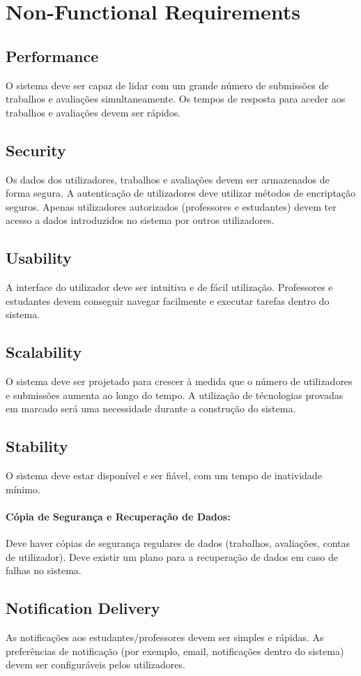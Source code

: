\documentclass[10pt]{article}
\begin{document}
\newpage

\section{Non-Functional Requirements}

\subsection{Performance}
O sistema deve ser capaz de lidar com um grande número de submissões de trabalhos e avaliações simultaneamente. 
Os tempos de resposta para aceder aos trabalhos e avaliações devem ser rápidos.

\subsection{Security}
Os dados dos utilizadores, trabalhos e avaliações devem ser armazenados de forma segura. 
A autenticação de utilizadores deve utilizar métodos de encriptação seguros. 
Apenas utilizadores autorizados (professores e estudantes) devem ter acesso a dados introduzidos no sistema por outros 
utilizadores.

\subsection{Usability}
A interface do utilizador deve ser intuitiva e de fácil utilização.
Professores e estudantes devem conseguir navegar facilmente e executar tarefas dentro do sistema.

\subsection{Scalability}
O sistema deve ser projetado para crescer à medida que o número de utilizadores e submissões aumenta ao longo do tempo.
A utilização de técnologias provadas em marcado será uma necessidade durante a construção do sistema.

\subsection{Stability}
O sistema deve estar disponível e ser fiável, com um tempo de inatividade mínimo.

\paragraph{Cópia de Segurança e Recuperação de Dados:}
Deve haver cópias de segurança regulares de dados (trabalhos, avaliações, contas de utilizador).
Deve existir um plano para a recuperação de dados em caso de falhas no sistema.

\subsection{Notification Delivery}
As notificações aos estudantes/professores devem ser simples e rápidas. 
As preferências de notificação (por exemplo, email, notificações dentro do sistema) devem ser configuráveis pelos utilizadores.
\end{document}
